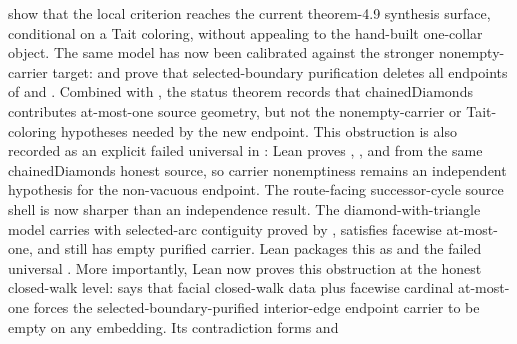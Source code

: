 \documentclass[11pt]{article}
\begin{document}
\begin{itemize}
show that the local criterion reaches the current theorem-4.9 synthesis
surface, conditional on a Tait coloring, without appealing to the hand-built
one-collar object.
The same model has now been calibrated against the stronger nonempty-carrier
target:
and
prove that selected-boundary purification deletes all endpoints of
 and .  Combined with
, the
status theorem
records that chainedDiamonds contributes at-most-one source geometry, but not
the nonempty-carrier or Tait-coloring hypotheses needed by the new endpoint.
This obstruction is also recorded as an explicit failed universal in
: Lean proves
,
, and
from the same chainedDiamonds honest source, so carrier nonemptiness remains an
independent hypothesis for the non-vacuous endpoint.
The route-facing successor-cycle source shell is now sharper than an
independence result.  The diamond-with-triangle model carries
 with selected-arc
contiguity proved by
,
satisfies facewise at-most-one, and still has empty purified carrier.  Lean
packages this as
 and the failed
universal
.
More importantly, Lean now proves this obstruction at the honest closed-walk
level:
says that facial closed-walk data plus facewise cardinal at-most-one forces the
selected-boundary-purified interior-edge endpoint carrier to be empty on any
embedding.  Its contradiction forms
and

\end{itemize}
\end{document}
